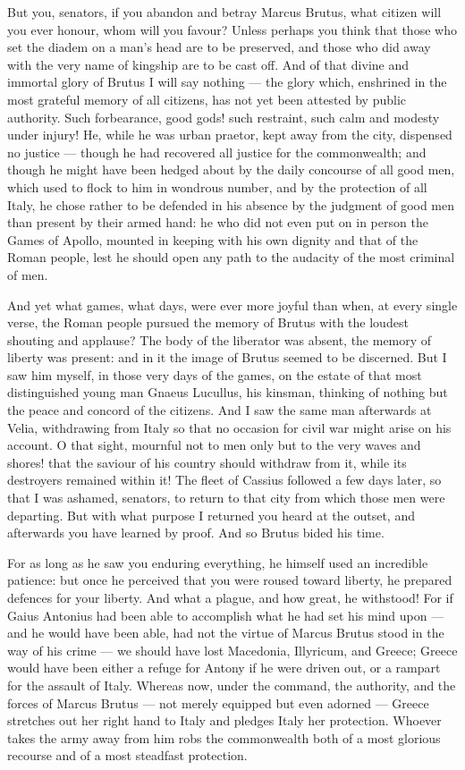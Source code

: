  But you, senators, if you abandon and betray Marcus Brutus, what citizen will you ever honour, whom will you favour? Unless perhaps you think that those who set the diadem on a man's head are to be preserved, and those who did away with the very name of kingship are to be cast off. And of that divine and immortal glory of Brutus I will say nothing --- the glory which, enshrined in the most grateful memory of all citizens, has not yet been attested by public authority. Such forbearance, good gods! such restraint, such calm and modesty under injury! He, while he was urban praetor, kept away from the city, dispensed no justice --- though he had recovered all justice for the commonwealth; and though he might have been hedged about by the daily concourse of all good men, which used to flock to him in wondrous number, and by the protection of all Italy, he chose rather to be defended in his absence by the judgment of good men than present by their armed hand: he who did not even put on in person the Games of Apollo, mounted in keeping with his own dignity and that of the Roman people, lest he should open any path to the audacity of the most criminal of men.

 And yet what games, what days, were ever more joyful than when, at every single verse, the Roman people pursued the memory of Brutus with the loudest shouting and applause? The body of the liberator was absent, the memory of liberty was present: and in it the image of Brutus seemed to be discerned. But I saw him myself, in those very days of the games, on the estate of that most distinguished young man Gnaeus Lucullus, his kinsman, thinking of nothing but the peace and concord of the citizens. And I saw the same man afterwards at Velia, withdrawing from Italy so that no occasion for civil war might arise on his account. O that sight, mournful not to men only but to the very waves and shores! that the saviour of his country should withdraw from it, while its destroyers remained within it! The fleet of Cassius followed a few days later, so that I was ashamed, senators, to return to that city from which those men were departing. But with what purpose I returned you heard at the outset, and afterwards you have learned by proof. And so Brutus bided his time.

 For as long as he saw you enduring everything, he himself used an incredible patience: but once he perceived that you were roused toward liberty, he prepared defences for your liberty. And what a plague, and how great, he withstood! For if Gaius Antonius had been able to accomplish what he had set his mind upon --- and he would have been able, had not the virtue of Marcus Brutus stood in the way of his crime --- we should have lost Macedonia, Illyricum, and Greece; Greece would have been either a refuge for Antony if he were driven out, or a rampart for the assault of Italy. Whereas now, under the command, the authority, and the forces of Marcus Brutus --- not merely equipped but even adorned --- Greece stretches out her right hand to Italy and pledges Italy her protection. Whoever takes the army away from him robs the commonwealth both of a most glorious recourse and of a most steadfast protection.


